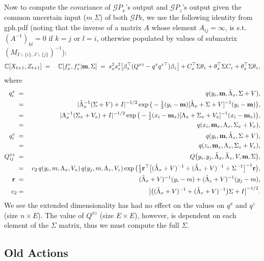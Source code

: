 \documentclass[9pt]{article}
\newcommand{\bfm}{{\bf m}}
\newcommand{\Cov}{{\mathbb C}}
\newcommand{\GP}{{\mathcal GP}}
\newcommand{\m}[1]{m_{#1}}                  %
\newcommand{\new}[1]{#1_{t\mathord{+}1}}    %
\newcommand{\pne}[1]{#1_{t\mathord{+}1}}   %
\newcommand{\inv}{^{-1}}
\newcommand{\nnn}{\nonumber \\}
\newcommand{\nn}{\nonumber}
\begin{document}
%
Now to compute the covariance of $\GP_x$'s output and $\GP_z$'s output given the common uncertain input ($\m,\Sigma$) of both $\GP$s,
we use the following identity from gph.pdf
(noting that the inverse of a matrix $A$ whose element $A_{ij} = \infty$,
is s.t. $(A\inv)_{kl} = 0$ if $k = j$ or $l=i$,
otherwise populated by values of submatrix $(M_{I \backslash \{i\},J \backslash \{j\}})\inv$):
%
\begin{eqnarray}
\Cov[\new{X},\pne{Z}]
\;&=&\;\Cov[f_x^*,f_z^*|\bfm,\Sigma]\;
=\;s_x^2s_z^2\big[\beta_x^\top (Q^{xz}-q^xq^{z\top})\beta_z \big]
+C_x^\top\Sigma\theta_z+\theta_x^\top\Sigma C_z+\theta_x^\top\Sigma\theta_z, \nn
\end{eqnarray}
%
where
%
\begin{eqnarray}
q^x_i
\;&=&\;q(y_i,\bfm,\hat{\Lambda}_x,\Sigma+V), \nnn
\;&=&\;|\hat{\Lambda}_x\inv (\Sigma+V)+I|^{-1/2}\exp\big(-\tfrac{1}{2}(y_i-\bfm)[\hat{\Lambda}_x+\Sigma+V]\inv(y_i-\bfm)\big), \nnn
\;&=&\;|\Lambda_x\inv (\Sigma_x + V_x)+I|^{-1/2}\exp\big(-\tfrac{1}{2}(x_i-\bfm_x)[\Lambda_x+\Sigma_x+V_x]\inv(x_i-\bfm_x)\big), \nnn
\;&=&\; q(x_i,\bfm_x,\Lambda_x,\Sigma_x+V_x), \nnn
q^z_i\;&=&\;q(y_i,\bfm,\hat{\Lambda}_z,\Sigma+V), \nnn
\;&=&\; q(z_i,\bfm_z,\Lambda_z,\Sigma_z+V_z), \nnn
Q^{xz}_{ij}\;&=&\;Q\big(y_i,y_j,\hat{\Lambda}_x,\hat{\Lambda}_z,V,\bfm,\Sigma\big), \nnn
\;&=&\; c_2\,q(y_i,m,\Lambda_x,V_x)\,q(y_j,m,\Lambda_z,V_z)
\exp\big(\tfrac{1}{2}{\bf r}^\top\big[(\hat{\Lambda}_x+V)\inv+(\hat{\Lambda}_z+V)\inv+\Sigma^{-1}\big]^{-1}{\bf r}\big), \nnn
{\bf r}\;&=&\;(\hat{\Lambda}_x+V)\inv(y_i-m)+(\hat{\Lambda}_z+V)\inv(y_j-m), \nnn
c_2&=&\big|\big((\hat{\Lambda}_x+V)\inv+(\hat{\Lambda}_z+V)\inv\big)\Sigma+I\big|^{-1/2}. \nn
\end{eqnarray}
%
We see the extended dimensionality has had no effect on the values on $q^x$ and $q^z$ (size $n \times E$).
The value of $Q^{xz}$ (size $E \times E$), however, is dependent on each element of the $\Sigma$ matrix,
thus we must compute the full $\Sigma$.

\subsection*{Old Actions}
\end{document}

